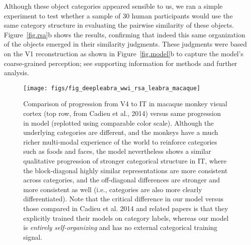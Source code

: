 \documentclass[11pt,twoside]{article}
\newif\myifpdf
\begin{document}
Although these object categories appeared sensible to us, we ran a simple experiment to test whether a sample of 30 human participants would use the same category structure in evaluating the pairwise similarity of these objects.  Figure~\ref{fig.rsa}b shows the results, confirming that indeed this same organization of the objects emerged in their similarity judgments.  These judgments were based on the V1 reconstruction as shown in Figure~\ref{fig.model}b to capture the model's coarse-grained perception; see supporting information for methods and further analysis.

\begin{figure}
  \centering\texttt{[image: figs/fig\_deepleabra\_wwi\_rsa\_leabra\_macaque]}
  \caption{Comparison of progression from V4 to IT in macaque monkey visual cortex (top row, from Cadieu et al., 2014) versus same progression in model (replotted using comparable color scale).  Although the underlying categories are different, and the monkeys have a much richer multi-modal experience of the world to reinforce categories such as foods and faces, the model nevertheless shows a similar qualitative progression of stronger categorical structure in IT, where the block-diagonal highly similar representations are more consistent across categories, and the off-diagonal differences are stronger and more consistent as well (i.e., categories are also more clearly differentiated).  Note that the critical difference in our model versus those compared in Cadieu et al. 2014 and related papers is that they explicitly trained their models on category labels, whereas our model is \emph{entirely self-organizing} and has no external categorical training signal.}
  \label{fig.macaque}
\end{figure}
\end{document}
